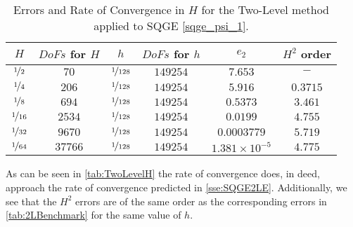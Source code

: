 \begin{table}[H]
  \begin{center}
  \begin{tabular}{|c|c|c|c|c|c|}
    \hline
    $H$ & $DoFs$ for $H$ & $h$ & $DoFs$ for $h$ & $e_2$ & $H^2$ order \\
    \hline
    $\nicefrac{1}{2}$ & $70$ & $\nicefrac{1}{128}$ & $149254$ & $7.653$ & $-$ \\[0.2em] 
    $\nicefrac{1}{4}$ & $206$ & $\nicefrac{1}{128}$ & $149254$ & $5.916$ & $0.3715$ \\[0.2em] 
    $\nicefrac{1}{8}$ & $694$ & $\nicefrac{1}{128}$ & $149254$ & $0.5373$ & $3.461$ \\[0.2em] 
    $\nicefrac{1}{16}$ & $2534$ & $\nicefrac{1}{128}$ & $149254$ & $0.0199$ & $4.755$ \\[0.2em] 
    $\nicefrac{1}{32}$ & $9670$ & $\nicefrac{1}{128}$ & $149254$ &  $0.0003779$ & $5.719$ \\[0.2em] 
    $\nicefrac{1}{64}$ & $37766$ & $\nicefrac{1}{128}$ & $149254$ & $1.381\times 10^{-5}$ & $4.775$ \\[0.2em]
    \hline
  \end{tabular}
  \caption{Errors and Rate of Convergence in $H$ for the Two-Level method applied to SQGE \eqref{sqge_psi_1}.}
  \label{tab:TwoLevelH}
  \end{center}
\end{table}

As can be seen in \autoref{tab:TwoLevelH} the rate of convergence does, in deed, approach the rate
of convergence predicted in \autoref{sse:SQGE2LE}. Additionally, we see that the $H^2$ errors are of
the same order as the corresponding errors in \autoref{tab:2LBenchmark} for the same value of $h$.

